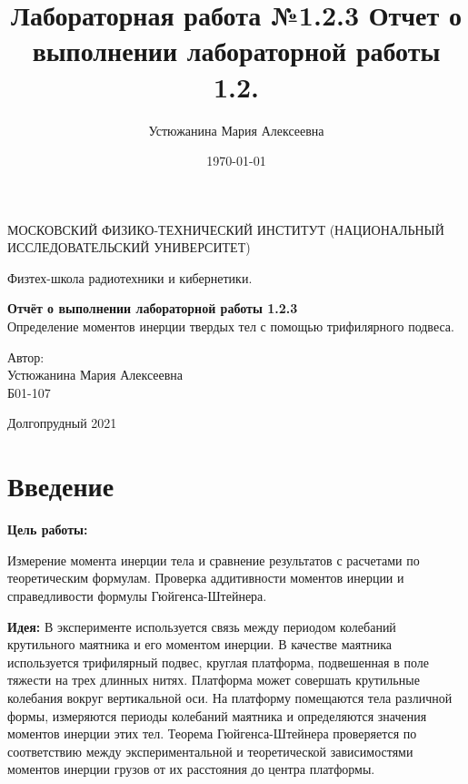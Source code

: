 \documentclass[a4paper,12pt]{article} %
\author{Устюжанина Мария Алексеевна}
\title{Лабораторная работа №1.2.3
Отчет о выполнении лабораторной работы 1.2.
}
\date{\today}
\begin{document}
\begin{titlepage}
	\begin{center}
		{\large МОСКОВСКИЙ ФИЗИКО-ТЕХНИЧЕСКИЙ ИНСТИТУТ (НАЦИОНАЛЬНЫЙ ИССЛЕДОВАТЕЛЬСКИЙ УНИВЕРСИТЕТ)}
	\end{center}
	\begin{center}
		{\large Физтех-школа радиотехники и кибернетики.}
	\end{center}
	
	
	\vspace{4.5cm}
	{\huge
		\begin{center}
			{\bf Отчёт о выполнении лабораторной работы 1.2.3}\\
			 Определение моментов инерции твердых тел с помощью трифилярного подвеса.
		\end{center}
	}
	\vspace{2cm}
	\begin{flushright}
		{\LARGE Автор:\\ Устюжанина Мария Алексеевна \\
			\vspace{0.2cm}
			Б01-107}
	\end{flushright}
	\vspace{8cm}
	\begin{center}
		Долгопрудный 2021
	\end{center}
\end{titlepage}

\section*{Введение}

\textbf{Цель работы:}

	Измерение момента инерции тела и сравнение результатов с расчетами по теоретическим формулам. Проверка аддитивности моментов инерции и справедливости формулы Гюйгенса-Штейнера.

\textbf{Идея:}
     В эксперименте используется связь между периодом колебаний крутильного маятника и его моментом инерции. В качестве маятника используется трифилярный подвес, круглая платформа, подвешенная в поле тяжести на трех длинных нитях. Платформа может совершать крутильные колебания вокруг вертикальной оси. На платформу помещаются тела различной формы, измеряются периоды колебаний маятника и определяются значения моментов инерции этих тел. Теорема Гюйгенса-Штейнера проверяется по соответствию между экспериментальной и теоретической зависимостями моментов инерции грузов от их расстояния до центра платформы.
\end{document}
